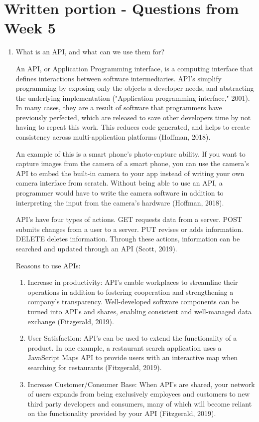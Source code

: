 \documentclass[]{article}
\begin{document}
\section{Written portion - Questions from Week 5}
\begin{enumerate}
	\item What is an API, and what can we use them for?
	
An API, or Application Programming interface, is a computing interface that defines interactions between software intermediaries.  API's simplify programming by exposing only the objects a developer needs, and abstracting the underlying implementation ("Application programming interface," 2001). In many cases, they are a result of software that programmers have previously perfected, which are released to save other developers time by not having to repeat this work.  This reduces code generated, and helps to create consistency across multi-application platforms (Hoffman, 2018).

An example of this is a smart phone's photo-capture ability.  If you want to capture images from the camera of a smart phone, you can use the camera's API to embed the built-in camera to your app instead of writing your own camera interface from scratch.  Without being able to use an API, a programmer would have to write the camera software in addition to interpreting the input from the camera's hardware (Hoffman, 2018).

API's have four types of actions.  GET requests data from a server.  POST submits changes from a user to a server.  PUT revises or adds information.  DELETE deletes information.  Through these actions, information can be searched and updated through an API (Scott, 2019).  

Reasons to use APIs:
\begin{enumerate}
	\item Increase in productivity: API's enable workplaces to streamline their operations in addition to fostering cooperation and strengthening a company's transparency.  Well-developed software components can be turned into API's and shares, enabling consistent and well-managed data exchange (Fitzgerald, 2019). 
	\item User Satisfaction: API's can be used to extend the functionality of a product.  In one example, a restaurant search application uses a JavaScript Maps API to provide users with an interactive map when searching for restaurants (Fitzgerald, 2019).
	\item Increase Customer/Consumer Base: When API's are shared, your network of users expands from being exclusively employees and customers to new third party developers and consumers, many of which will become reliant on the functionality provided by your API (Fitzgerald, 2019).
	

\end{enumerate}
\end{enumerate}
\end{document}
